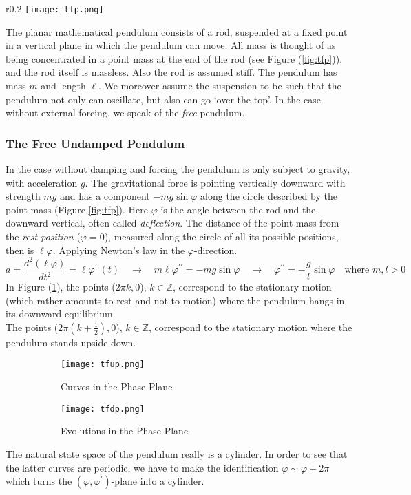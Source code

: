 \begin{wrapfigure}{r}{0.2\linewidth}
	\centering
	\texttt{[image: tfp.png]}
	\caption{Sketch of the planar mathematical pendulum.}
	\label{fig:tfp}
\end{wrapfigure}
The planar mathematical pendulum consists of a rod, suspended at a fixed point in a vertical plane in which the pendulum can move.
All mass is thought of as being concentrated in a point mass at the end of the rod (see Figure (\ref{fig:tfp})), and the rod itself is massless.
Also the rod is assumed stiff.
The pendulum has mass $m$ and length $\ell$.
We moreover assume the suspension to be such that the pendulum not only can oscillate, but also can go `over the top'.
In the case without external forcing, we speak of the \emph{free} pendulum.
\subsubsection{The Free Undamped Pendulum}
In the case without damping and forcing the pendulum is only subject to gravity, with acceleration $g$.
The gravitational force is pointing vertically downward with strength $mg$ and has a component $-mg\sin\varphi$ along the circle described by the point mass (Figure \ref{fig:tfp}).
Here $\varphi$ is the angle between the rod and the downward vertical, often called \emph{deflection}.
The distance of the point mass from the \emph{rest position} ($\varphi=0$), measured along the circle of all its possible positions, then is $\ell\varphi$.
Applying Newton’s law in the $\varphi$-direction.
\begin{equation*}
	a=\frac{d^2(\ell\varphi)}{dt^2}=\ell\varphi^{\prime\prime}(t)\quad\rightarrow\quad
	m\ell\varphi^{\prime\prime}=-mg\sin\varphi\quad\rightarrow\quad
	\varphi^{\prime\prime}=-\frac{g}{l}\sin\varphi\quad\text{where $m,l>0$}
\end{equation*}
In Figure (\ref{fig:tfup}), the points ($2\pi k,0$), $k\in\mathbb{Z}$, correspond to the stationary motion (which rather amounts to rest and not to motion) where the pendulum hangs in its downward equilibrium.\\
The points ($2\pi \left(k+\frac{1}{2}\right),0$), $k\in\mathbb{Z}$, correspond to the stationary motion where the pendulum stands upside down.
\begin{figure}[h!]
	\centering
	\begin{subfigure}{0.4\linewidth}
		\centering
		\texttt{[image: tfup.png]}
		\caption{Curves in the Phase Plane}
		\label{fig:tfup}
	\end{subfigure}
	\vline
	\begin{subfigure}{0.36\linewidth}
		\centering
		\texttt{[image: tfdp.png]}
		\caption{Evolutions in the Phase Plane}
		\label{fig:tfdp}
	\end{subfigure}
	\caption{}
\end{figure}
\begin{remark}
	The natural state space of the pendulum really is a cylinder.
	In order to see that the latter curves are periodic, we have to make the identification $\varphi\sim\varphi+2\pi$ which turns the $(\varphi,\varphi^\prime)$-plane into a cylinder.
\end{remark}
